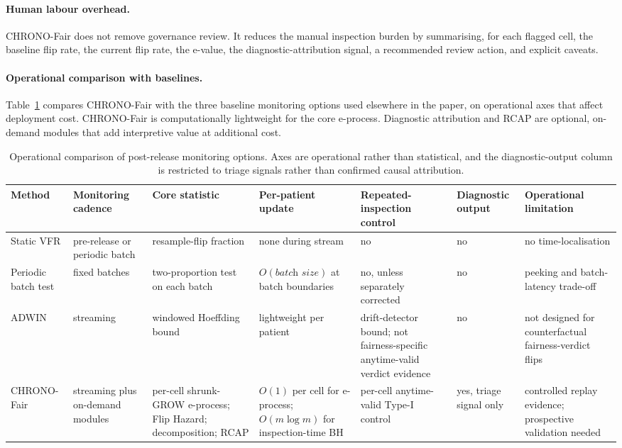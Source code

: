 \documentclass[acmsmall,nonacm,review,anonymous]{acmart}
\newcommand{\1}[1]{\mathbf{1}\!\left\{#1\right\}}
\begin{document}
\paragraph{Human labour overhead.}
CHRONO-Fair does not remove governance review. It reduces the manual inspection burden by summarising, for each flagged cell, the baseline flip rate, the current flip rate, the e-value, the diagnostic-attribution signal, a recommended review action, and explicit caveats.

\paragraph{Operational comparison with baselines.}
Table~\ref{tab:overhead} compares CHRONO-Fair with the three baseline monitoring options used elsewhere in the paper, on operational axes that affect deployment cost. CHRONO-Fair is computationally lightweight for the core e-process. Diagnostic attribution and RCAP are optional, on-demand modules that add interpretive value at additional cost.

\begin{table}[t]
\centering
\caption{Operational comparison of post-release monitoring options. Axes are operational rather than statistical, and the diagnostic-output column is restricted to triage signals rather than confirmed causal attribution.}
\label{tab:overhead}
\footnotesize
\begin{tabular}{p{2.0cm} p{1.8cm} p{1.9cm} p{2.0cm} p{2.4cm} p{1.7cm} p{2.6cm}}
\toprule
Method & Monitoring cadence & Core statistic & Per-patient update & Repeated-inspection control & Diagnostic output & Operational limitation \\
\midrule
Static VFR & pre-release or periodic batch & resample-flip fraction & none during stream & no & no & no time-localisation \\
Periodic batch test & fixed batches & two-proportion test on each batch & $O(\textit{batch size})$ at batch boundaries & no, unless separately corrected & no & peeking and batch-latency trade-off \\
ADWIN & streaming & windowed Hoeffding bound & lightweight per patient & drift-detector bound; not fairness-specific anytime-valid verdict evidence & no & not designed for counterfactual fairness-verdict flips \\
CHRONO-Fair & streaming plus on-demand modules & per-cell shrunk-GROW e-process; Flip Hazard; decomposition; RCAP & $O(1)$ per cell for e-process; $O(m \log m)$ for inspection-time BH & per-cell anytime-valid Type-I control & yes, triage signal only & controlled replay evidence; prospective validation needed \\
\bottomrule
\end{tabular}
\end{table}
\end{document}
